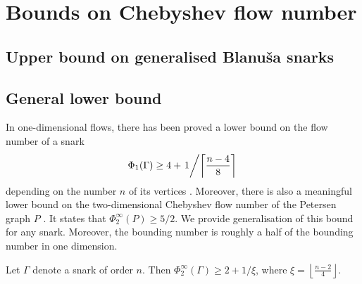 \chapter{Bounds on Chebyshev flow number} %


\section{Upper bound on generalised Blanuša snarks}

\section{General lower bound}

In one-dimensional flows, there has been proved a lower bound on the flow number of a snark 
\begin{equation*}
	\Phi_1(\Gamma) \geq 4 + \left.1\middle/\left\lceil\frac{n-4}{8}\right\rceil\right.
\end{equation*}
depending on the number $n$ of its vertices \cite[p. 14]{cycle_rank}. Moreover, there is also a meaningful lower bound on the two-dimensional Chebyshev flow number of the Petersen graph $P$ \cite[p. 99]{gloria_phd}. It states that $\Phi_2^\infty(P)\geq 5/2$. We provide generalisation of this bound for any snark. Moreover, the bounding number is roughly a half of the bounding number in one dimension.

\begin{proposition}
	Let $\Gamma$ denote a snark of order $n$. Then $\Phi_2^{\infty}(\Gamma) \geq 2+1 / \xi$, where $\xi=\left\lfloor\frac{n-2}{4}\right\rfloor$.
\end{proposition}

